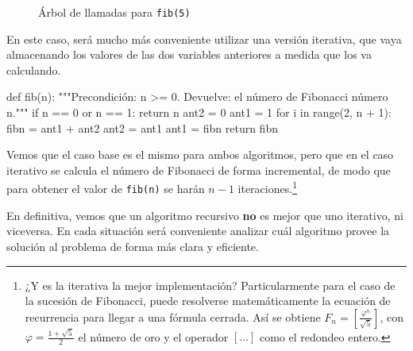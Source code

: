 \begin{figure}[htb]
\caption{Árbol de llamadas para \lstinline!fib(5)!}
\label{fibonacci}
\end{figure}

En este caso, será mucho más conveniente utilizar una versión iterativa,
que vaya almacenando los valores de las dos variables anteriores a medida
que los va calculando.

\begin{codigo-python-sn}
def fib(n):
    """Precondición: n >= 0.
       Devuelve: el número de Fibonacci número n."""
    if n == 0 or n == 1:
        return n
    ant2 = 0
    ant1 = 1
    for i in range(2, n + 1):
        fibn = ant1 + ant2
        ant2 = ant1
        ant1 = fibn
    return fibn
\end{codigo-python-sn}

Vemos que el caso base es el mismo para ambos algoritmos, pero que en el
caso iterativo se calcula el número de Fibonacci de forma incremental, de
modo que para obtener el valor de \lstinline!fib(n)! se harán $n-1$
iteraciones.\footnote{¿Y es la iterativa la mejor implementación?
Particularmente para el caso de la sucesión de Fibonacci, puede resolverse
matemáticamente la ecuación de recurrencia para llegar a una fórmula
cerrada. Así se obtiene $F_n = \left[ \frac{\varphi^n}{\sqrt5} \right]$, con
$\varphi = \frac{1 + \sqrt5}2$ el número de oro y el operador
$\left[ \dots \right]$ como el redondeo entero.}

\begin{atencion}
En definitiva, vemos que un algoritmo recursivo {\bf no} es mejor que uno
iterativo, ni viceversa.  En cada situación será conveniente analizar cuál
algoritmo provee la solución al problema de forma más clara y eficiente.
\end{atencion}

